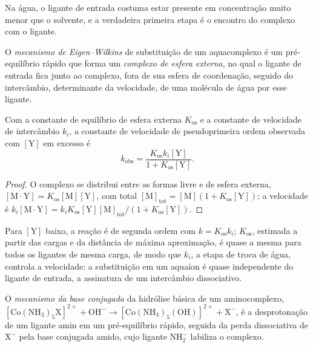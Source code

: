 Na água, o ligante de entrada costuma estar presente em concentração muito menor
que o solvente, e a verdadeira primeira etapa é o encontro do complexo com o
ligante.

\begin{definition}\label{def:b3:complex-mechanisms:eigen-wilkins}
O \emph{mecanismo de Eigen--Wilkins} de
substituição de um aquacomplexo é um pré-equilíbrio rápido que forma um
\emph{complexo de esfera externa}, no qual o ligante
de entrada fica junto ao complexo, fora de sua esfera de coordenação, seguido do
intercâmbio, determinante da velocidade, de uma molécula de água por esse ligante.
\end{definition}

\begin{theorem}\label{thm:b3:complex-mechanisms:eigen-wilkins}
Com a constante de equilíbrio de esfera externa $K_{\mathrm{os}}$ e a constante de velocidade de intercâmbio
$k_i$, a constante de velocidade de pseudoprimeira ordem observada com $[\mathrm Y]$ em excesso é
\[
  k_{\mathrm{obs}} = \frac{K_{\mathrm{os}}k_i[\mathrm Y]}{1 + K_{\mathrm{os}}[\mathrm Y]} .
\]
\end{theorem}

\begin{proof}
O complexo se distribui entre as formas livre e de esfera externa, $[\mathrm{M\cdot Y}] = K_{\mathrm{os}}[\mathrm M][\mathrm Y]$,
com total $[\mathrm M]_{\mathrm{tot}} = [\mathrm M](1 + K_{\mathrm{os}}[\mathrm Y])$; a velocidade é $k_i[\mathrm{M\cdot Y}] = k_iK_{\mathrm{os}}[\mathrm Y][\mathrm M]_{\mathrm{tot}}/(1 + K_{\mathrm{os}}[\mathrm Y])$.
\end{proof}

Para $[\mathrm Y]$ baixo, a reação é de segunda ordem com $k = K_{\mathrm{os}}k_i$; $K_{\mathrm{os}}$, estimada a partir das
cargas e da distância de máxima aproximação, é quase a mesma para todos os
ligantes de mesma carga, de modo que $k_i$, a etapa de troca de água, controla a
velocidade: a substituição em um aquaíon é quase independente do ligante
de entrada, a assinatura de um intercâmbio dissociativo.

\begin{definition}\label{def:b3:complex-mechanisms:conjugate-base}
O \emph{mecanismo da base conjugada} da hidrólise
básica de um aminocomplexo, $\mathrm{[Co(NH_3)_5X]^{2+} + OH^- \to [Co(NH_3)_5(OH)]^{2+} + X^-}$, é
a desprotonação de um ligante amin em um pré-equilíbrio rápido, seguida da
perda dissociativa de $\mathrm X^-$ pela base conjugada amido, cujo ligante $\mathrm{NH_2^-}$
labiliza o complexo.
\end{definition}

